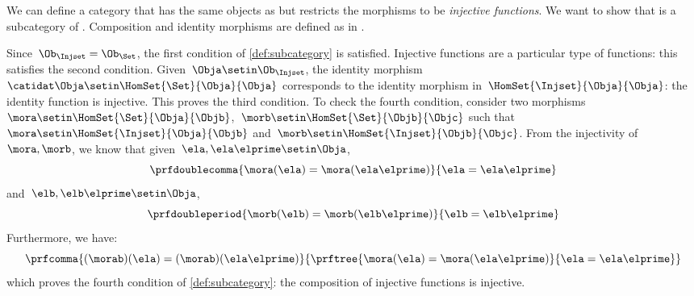\begin{example}
    \label{ex:Injset}
    We can define a category \Injset that has the same objects as \Set but restricts the morphisms to be \emph{injective functions}.
    We want to show that \Injset is a subcategory of \Set.
    Composition and identity morphisms are defined as in \Set.

    Since~$\Ob_{\Injset}=\Ob_{\Set}$, the first condition of \cref{def:subcategory} is satisfied.
    Injective functions are a particular type of functions: this satisfies the second condition.
    Given~$\Obja\setin \Ob_{\Injset}$, the identity morphism~$\catidat\Obja\setin \HomSet{\Set}{\Obja}{\Obja}$ corresponds to the identity morphism in~$\HomSet{\Injset}{\Obja}{\Obja}$: the identity function is injective.
    This proves the third condition.
    To check the fourth condition, consider two morphisms~$\mora \setin \HomSet{\Set}{\Obja}{\Objb}$,~$\morb \setin \HomSet{\Set}{\Objb}{\Objc}$ such that~$\mora \setin \HomSet{\Injset}{\Obja}{\Objb}$ and~$\morb\setin \HomSet{\Injset}{\Objb}{\Objc}$.
    From the injectivity of~$\mora,\morb$, we know that given~$\ela,\ela\elprime\setin \Obja$,
    \begin{equation}
        \prfdoublecomma{
            \mora(\ela)=\mora(\ela\elprime)
        }{
            \ela=\ela\elprime
        }
    \end{equation}
    and~$\elb,\elb\elprime\setin \Obja$,
    \begin{equation}
        \prfdoubleperiod{
            \morb(\elb)=\morb(\elb\elprime)
        }{
            \elb=\elb\elprime
        }
    \end{equation}
    Furthermore, we have:
    \begin{equation}
        \prfcomma{
            (\morab)(\ela)
            =(\morab)(\ela\elprime)
        }{
            \prftree{
                \mora(\ela)=\mora(\ela\elprime)
            }{
                \ela=\ela\elprime
            }
        }
    \end{equation}
    which proves the fourth condition of \cref{def:subcategory}: the composition of injective functions is injective.
\end{example}

